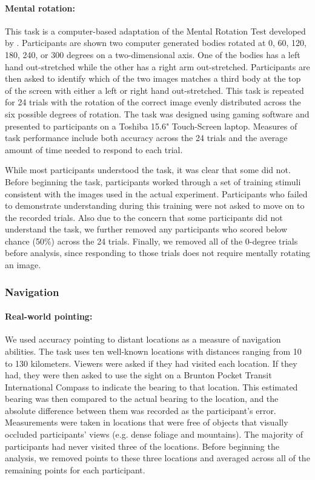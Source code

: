 \paragraph{Mental rotation:}  This task is a computer-based adaptation of the Mental Rotation Test developed by \citep{shepard1971mental}.  Participants are shown two computer generated bodies rotated at 0, 60, 120, 180, 240, or 300 degrees on a two-dimensional axis.  One of the bodies has a left hand out-stretched while the other has a right arm out-stretched.  Participants are then asked to identify which of the two images matches a third body at the top of the screen with either a left or right hand out-stretched.  This task is repeated for 24 trials with the rotation of the correct image evenly distributed across the six possible degrees of rotation.  The task was designed using gaming software \citep{unity14} and presented to participants on a Toshiba 15.6" Touch-Screen laptop.  Measures of task performance include both accuracy across the 24 trials and the average amount of time needed to respond to each trial.

While most participants understood the task, it was clear that some did not. Before beginning the task, participants worked through a set of training stimuli consistent with the images used in the actual experiment.  Participants who failed to demonstrate understanding during this training were not asked to move on to the recorded trials.  Also due to the concern that some participants did not understand the task, we further removed any participants who scored below chance (50\%) across the 24 trials.  Finally, we removed all of the 0-degree trials before analysis, since responding to those trials does not require mentally rotating an image.

		\subsubsection{Navigation}
		\label{sec:2.2.2}
\paragraph{Real-world pointing:}  We used accuracy pointing to distant locations as a measure of navigation abilities. The task uses ten well-known locations with distances ranging from 10 to 130 kilometers.  Viewers were asked if they had visited each location. If they had, they were then asked to use the sight on a Brunton Pocket Transit International Compass to indicate the bearing to that location. This estimated bearing was then compared to the actual bearing to the location, and the absolute difference between them was recorded as the participant's error. Measurements were taken in locations that were free of objects that visually occluded participants' views (e.g. dense foliage and mountains).  The majority of participants had never visited three of the locations.  Before beginning the analysis, we removed points to these three locations and averaged across all of the remaining points for each participant.

